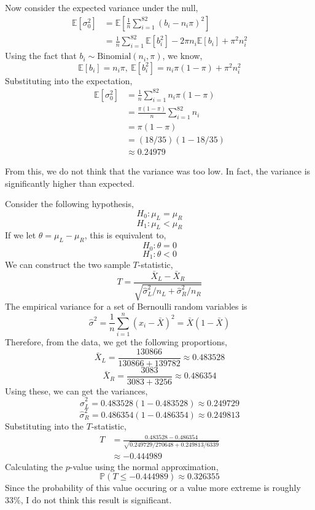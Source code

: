 \documentclass[12pt,twoside]{article}
\begin{document}
\begin{problems}
\begin{problemparts}
Now consider the expected variance under the null,
\begin{align*}
    \mathbb{E}[\sigma_0^2] &= \mathbb{E}\left[\frac{1}{n} \sum_{i = 1}^{82}
    (b_i - n_i \pi)^2\right] \\
    &= \frac{1}{n} \sum_{i = 1}^{82} \mathbb{E}[b_i^2] - 2 \pi n_i
    \mathbb{E}[b_i] + \pi^2 n_i^2
\end{align*}
Using the fact that $b_i \sim \mathrm{Binomial}(n_i, \pi)$, we know,
$$ \mathbb{E}[b_i] = n_i \pi,\ \mathbb{E}[b_i^2] = n_i \pi (1 - \pi) + \pi^2
n_i^2 $$
Substituting into the expectation,
\begin{align*}
    \mathbb{E}[\sigma_0^2] &= \frac{1}{n} \sum_{i = 1}^{82} n_i \pi (1 - \pi) \\
    &= \frac{\pi (1 - \pi)}{n} \sum_{i = 1}^{82} n_i \\
    &= \pi (1 - \pi) \\
    &= (18/35) (1 - 18/35) \\
    &\approx \boxed{0.24979}
\end{align*}

From this, we do not think that the variance was too low. In fact, the
variance is significantly higher than expected.

\end{problemparts}

\newpage

\problem  %

Consider the following hypothesis,
$$ H_0 : \mu_L = \mu_R $$
$$ H_1 : \mu_L < \mu_R $$
If we let $\theta = \mu_L - \mu_R$, this is equivalent to,
$$ H_0 : \theta = 0 $$
$$ H_1 : \theta < 0 $$
We can construct the two sample $T$-statistic,
$$ T = \frac{\bar{X}_L - \bar{X}_R}{\sqrt{\hat{\sigma}_L^2/n_L +
\hat{\sigma}_R^2/n_R}} $$
The empirical variance for a set of Bernoulli random variables is
$$ \hat{\sigma}^2 = \frac{1}{n} \sum_{i = 1}^n (x_i - \bar{X})^2 = \bar{X} (1
- \bar{X}) $$
Therefore, from the data, we get the following proportions,
$$ \bar{X}_L = \frac{130866}{130866 + 139782} \approx 0.483528 $$
$$ \bar{X}_R = \frac{3083}{3083 + 3256} \approx 0.486354 $$
Using these, we can get the variances,
$$ \hat{\sigma}_L^2 = 0.483528 (1 - 0.483528) \approx 0.249729 $$
$$ \hat{\sigma}_R^2 = 0.486354 (1 - 0.486354) \approx 0.249813 $$
Substituting into the $T$-statistic,
\begin{align*}
    T &= \frac{0.483528 - 0.486354}{\sqrt{0.249729/270648 + 0.249813/6339}} \\
    &\approx -0.444989
\end{align*}
Calculating the $p$-value using the normal approximation,
$$ \boxed{\mathbb{P}(T \leq -0.444989) \approx 0.326355} $$
Since the probability of this value occuring or a value more extreme is
roughly 33\%, I do not think this result is significant.


\end{problems}
\end{document}
